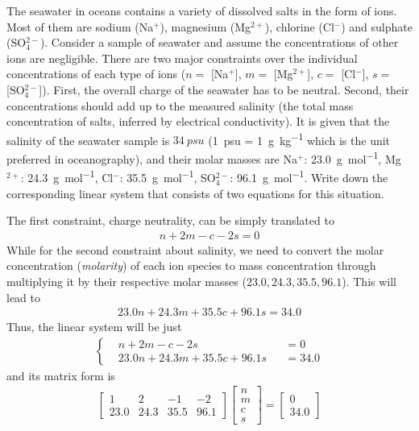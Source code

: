 \begin{exmp}
\label{exmp:seaion}
The seawater in oceans contains a variety of dissolved salts in the form of ions. Most of them are sodium (Na$^+$), magnesium (Mg$^{2+}$), chlorine (Cl$^-$) and sulphate (SO$_4^{2-}$). Consider a sample of seawater and assume the concentrations of other ions are negligible. There are two major constraints over the individual concentrations of each type of ions ($n=$ [Na$^+$], $m=$ [Mg$^{2+}$], $c=$ [Cl$^-$], $s=$ [SO$_4^{2-}$]). First, the overall charge of the seawater has to be neutral. Second, their concentrations should add up to the measured salinity (the total mass concentration of salts, inferred by electrical conductivity). It is given that the salinity of the seawater sample is $\SI{34}{psu}$ (\SI{1}{psu} = \SI{1}{\g\per\kg} which is the unit preferred in oceanography), and their molar masses are Na$^+$: \SI{23.0}{\g \per \mol}, Mg$^{2+}$: \SI{24.3}{\g \per \mol}, Cl$^-$: \SI{35.5}{\g \per \mol}, SO$_4^{2-}$: \SI{96.1}{\g \per \mol}. Write down the corresponding linear system that consists of two equations for this situation.
\end{exmp}
\begin{solution}
The first constraint, charge neutrality, can be simply translated to
\begin{align*}
n + 2m - c - 2s = 0
\end{align*}
While for the second constraint about salinity, we need to convert the molar concentration (\textit{molarity}) of each ion species to mass concentration through multiplying it by their respective molar masses ($23.0, 24.3, 35.5, 96.1$). This will lead to
\begin{align*}
23.0 n + 24.3 m + 35.5 c + 96.1s = 34.0
\end{align*}
Thus, the linear system will be just
\begin{align}
\left\{\begin{alignedat}{2}
& n + 2m - c - 2s& &= 0 \\
& 23.0 n + 24.3 m + 35.5 c + 96.1s& &= 34.0
\end{alignedat}\right.
\end{align}
and its matrix form is
\begin{align*}
\begin{bmatrix}
1 & 2 & -1 & -2 \\
23.0 & 24.3 & 35.5 & 96.1    
\end{bmatrix}
\begin{bmatrix}
n \\
m \\
c \\
s
\end{bmatrix}
=
\begin{bmatrix}
0 \\
34.0
\end{bmatrix}
\end{align*}
\end{solution}

